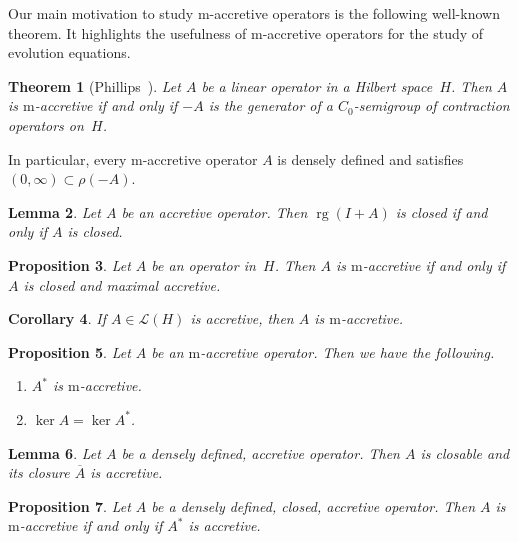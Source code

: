\documentclass[a4paper,oneside,12pt]{amsart}
\theoremstyle{plain}
\newtheorem{theorem}{Theorem}[section]
\newtheorem{proposition}[theorem]{Proposition}
\newtheorem{corollary}[theorem]{Corollary}
\newtheorem{lemma}[theorem]{Lemma}
\theoremstyle{definition}
\begin{document}
Our main motivation to study {\ensuremath{\text{m}}}-accretive operators is the following well-known theorem.
It highlights the usefulness of {\ensuremath{\text{m}}}-accretive operators for the study of evolution equations.
\begin{theorem}[Phillips~{\cite[Theorem~1.1.3]{Phi59}}]
Let $A$ be a linear operator in a Hilbert space~$H$. 
Then $A$ is {\ensuremath{\text{m}}}-accretive if and only if $-A$ is the generator of a $C_0$-semigroup of contraction operators on~$H$.
\end{theorem}
In particular, every {\ensuremath{\text{m}}}-accretive operator $A$ is densely defined and satisfies $(0,\infty)\subset\rho(-A)$.

\begin{lemma}\label{lem:acc-clrg}
Let $A$ be an accretive operator. Then $\operatorname{rg}(I+A)$ is closed if and only if $A$ is closed.
\end{lemma}

\begin{proposition}\label{prop:macc-maxacc}
Let $A$ be an operator in~$H$. Then $A$ is {\ensuremath{\text{m}}}-accretive if and only if $A$ is closed and maximal accretive.
\end{proposition}

\begin{corollary}\label{cor:bounded-macc}
If $A\in{\mathcal{L}}(H)$ is accretive, then $A$ is {\ensuremath{\text{m}}}-accretive.
\end{corollary}

\begin{proposition}\label{prop:macc}
Let $A$ be an {\ensuremath{\text{m}}}-accretive operator. Then we have the following.
\begin{enumerate}[\upshape (a)]
\item $A^*$ is {\ensuremath{\text{m}}}-accretive.
\item\label{en:ker-macc} $\ker A = \ker A^*$.
\end{enumerate}
\end{proposition}

\begin{lemma}\label{lem:acc-ddcl}
Let $A$ be a densely defined, accretive operator. Then $A$ is closable and its closure ${\overline{{A}}}$ is accretive.
\end{lemma}

\begin{proposition}\label{prop:macc-Asacc}
Let $A$ be a densely defined, closed, accretive operator. Then $A$ is {\ensuremath{\text{m}}}-accretive if and only if $A^*$ is accretive.
\end{proposition}
\end{document}
